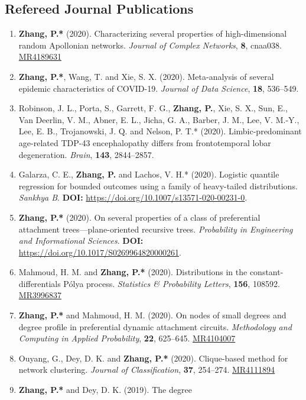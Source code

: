 \documentclass[margin]{res}
\def\MR#1{\href{http://www.ams.org/mathscinet-getitem?mr=#1}{MR#1}}
\begin{document}
\begin{resume}
\subsection{Refereed Journal Publications}
\begin{enumerate}
	\item {\bf Zhang, P.*} (2020). Characterizing several 
	properties of high-dimensional random Apollonian networks. {\em 
	Journal of Complex Networks}, {\bf 8}, cnaa038. \MR{4189631}
	\item {\bf Zhang, P.*}, {\sc Wang, T.} and {\sc Xie, S. X.} 
	(2020). Meta-analysis of several epidemic characteristics of 
	COVID-19. {\em Journal of Data Science}, {\bf 18}, 536--549.
	\item {\sc Robinson, J. L., Porta, S., Garrett, F. G.}, {\sc \bf 
	Zhang, P.}, {\sc Xie, S. X., Sun, E., Van Deerlin, V. M., Abner, 
	E. L., Jicha, G. A., Barber, J. M., Lee, V. M.-Y., Lee, E. B., 
	Trojanowski, J. Q.} and {\sc Nelson, P. T.*} (2020). 
	Limbic-predominant age-related TDP-43 encephalopathy differs 
	from frontotemporal lobar degeneration. {\em Brain}, {\bf 143}, 
	2844--2857.
	\item {\sc Galarza, C. E.}, {\bf Zhang, P.} and {\sc Lachos, 
	V. H.*} (2020). Logistic quantile regression for bounded 
	outcomes 
	using a family of heavy-tailed distributions. {\em Sankhya B}. 
	\textbf{DOI:} \url{https://doi.org/10.1007/s13571-020-00231-0}.
	\item {\bf Zhang, P.*} (2020). On several properties of a 
	class of preferential attachment trees---plane-oriented 
	recursive trees. {\em Probability in Engineering and 
	Informational Sciences}. 
	\textbf{DOI:} \url{https://doi.org/10.1017/S0269964820000261}.
	\item {\sc Mahmoud, H. M.} and {\bf Zhang, P.*} (2020). 
	Distributions in the constant-differentials P\'{o}lya process. 
	{\em Statistics \& Probability Letters}, \textbf{156}, 108592. 
	\MR{3996837}
	\item {\bf Zhang, P.*} and {\sc Mahmoud, H. M.} (2020). On 
	nodes of small degrees and degree profile in preferential 
	dynamic attachment circuits. {\em Methodology and Computing in 
	Applied Probability}, \textbf{22}, 625--645. \MR{4104007}
	\item {\sc Ouyang, G., Dey, D. K.} and {\bf Zhang, P.*} (2020). 
	Clique-based method for network clustering. {\em Journal of 
	Classification}, \textbf{37}, 254--274. \MR{4111894}
	\item {\bf Zhang, P.*} and {\sc Dey, D. K.} (2019). The degree 

\end{enumerate}
\end{resume}
\end{document}
